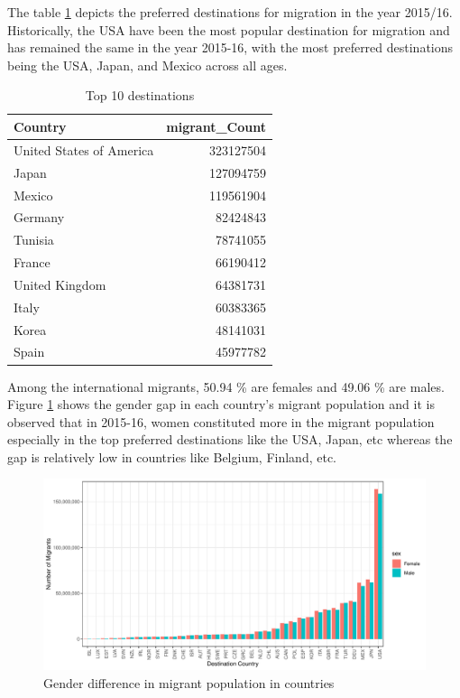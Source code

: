\documentclass[11pt,a4paper,]{article}
\begin{document}
The table \ref{tab:topdestinations} depicts the preferred destinations for migration in the year 2015/16. Historically, the USA have been the most popular destination for migration and has remained the same in the year 2015-16, with the most preferred destinations being the USA, Japan, and Mexico across all ages.

\begin{table}

\caption{\label{tab:topdestinations}Top 10 destinations}
\centering
\begin{tabular}[t]{lr}
\toprule
Country & migrant\_Count\\
\midrule
\rowcolor{gray!6}  United States of America & 323127504\\
Japan & 127094759\\
\rowcolor{gray!6}  Mexico & 119561904\\
Germany & 82424843\\
\rowcolor{gray!6}  Tunisia & 78741055\\
\addlinespace
France & 66190412\\
\rowcolor{gray!6}  United Kingdom & 64381731\\
Italy & 60383365\\
\rowcolor{gray!6}  Korea & 48141031\\
Spain & 45977782\\
\bottomrule
\end{tabular}
\end{table}

Among the international migrants, 50.94 \% are females and 49.06 \% are males. Figure \ref{fig:gendergap} shows the gender gap in each country's migrant population and it is observed that in 2015-16, women constituted more in the migrant population especially in the top preferred destinations like the USA, Japan, etc whereas the gap is relatively low in countries like Belgium, Finland, etc.

\begin{figure}
\centering
\includegraphics{ETC5513assignment4_files/figure-latex/gendergap-1.pdf}
\caption{\label{fig:gendergap}Gender difference in migrant population in countries}
\end{figure}
\end{document}

